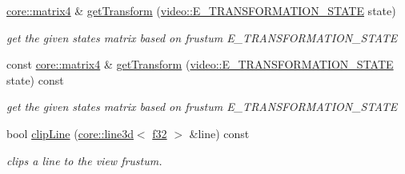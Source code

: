 \begin{DoxyCompactItemize}
\hyperlink{namespaceirr_1_1core_a4c9d4e29899535971052810954a14431}{core\+::matrix4} \& \hyperlink{structirr_1_1scene_1_1SViewFrustum_a09f990be73e386e0a2acedf2e647f695}{get\+Transform} (\hyperlink{namespaceirr_1_1video_a15b57657a320243be03ae6f66fcff43d}{video\+::\+E\+\_\+\+T\+R\+A\+N\+S\+F\+O\+R\+M\+A\+T\+I\+O\+N\+\_\+\+S\+T\+A\+TE} state)
\begin{DoxyCompactList}\small\item\em get the given state\textquotesingle{}s matrix based on frustum E\+\_\+\+T\+R\+A\+N\+S\+F\+O\+R\+M\+A\+T\+I\+O\+N\+\_\+\+S\+T\+A\+TE \end{DoxyCompactList}\item 
\mbox{\label{structirr_1_1scene_1_1SViewFrustum_ad663508eeee5cf4996a91a6bc926bea2}} 
const \hyperlink{namespaceirr_1_1core_a4c9d4e29899535971052810954a14431}{core\+::matrix4} \& \hyperlink{structirr_1_1scene_1_1SViewFrustum_ad663508eeee5cf4996a91a6bc926bea2}{get\+Transform} (\hyperlink{namespaceirr_1_1video_a15b57657a320243be03ae6f66fcff43d}{video\+::\+E\+\_\+\+T\+R\+A\+N\+S\+F\+O\+R\+M\+A\+T\+I\+O\+N\+\_\+\+S\+T\+A\+TE} state) const
\begin{DoxyCompactList}\small\item\em get the given state\textquotesingle{}s matrix based on frustum E\+\_\+\+T\+R\+A\+N\+S\+F\+O\+R\+M\+A\+T\+I\+O\+N\+\_\+\+S\+T\+A\+TE \end{DoxyCompactList}\item 
bool \hyperlink{structirr_1_1scene_1_1SViewFrustum_a8d4a42afc55dde3b193ad0b1311f9dfe}{clip\+Line} (\hyperlink{classirr_1_1core_1_1line3d}{core\+::line3d}$<$ \hyperlink{namespaceirr_a0277be98d67dc26ff93b1a6a1d086b07}{f32} $>$ \&line) const
\begin{DoxyCompactList}\small\item\em clips a line to the view frustum. \end{DoxyCompactList}\end{DoxyCompactItemize}
